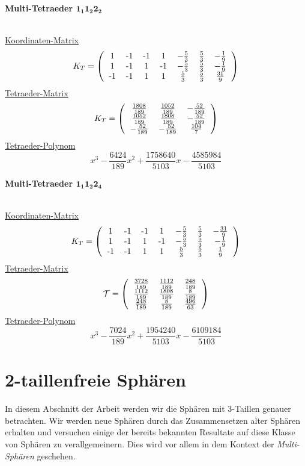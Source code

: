 \documentclass[12pt,titlepage,twoside,cleardoublepage]{article}
\theoremstyle{nummermitklammern}
\numberwithin{equation}{section}
\begin{document}
 \begin{large}
 \textbf{Multi-Tetraeder $\textbf{1}_\textbf{1}\textbf{1}_\textbf{2}\textbf{2}_\textbf{2}$}
 \end{large}\\
 \underline{Koordinaten-Matrix}
\[
K_T=\left(\begin{tabular}{ccccccc}
 1&-1&-1&1&$-\frac{5}{3}$&$\frac{5}{3}$&$-\frac{1}{9}$\\
 1&-1&1&-1&$-\frac{5}{3}$&$\frac{5}{3}$&$-\frac{1}{9}$\\
-1&-1&1&1&$\frac{5}{3}$&$\frac{5}{3}$&$\frac{31}{9}$\\
\end{tabular}\right)
\] 
\underline{Tetraeder-Matrix}
\[
K_T=\left(\begin{tabular}{ccc}
$\frac{1808}{189}$& $\frac{1052}{189}$& $-\frac{52}{189}$ \\
 $\frac{1052}{189}$& $\frac{1808}{189}$& $-\frac{52}{189}$ \\
 $-\frac{52}{189}$& $-\frac{52}{189}$& $\frac{104}{7}$ \\ 
\end{tabular}\right)
\]
\underline{Tetraeder-Polynom}
\[
  x^3-\frac{6424}{189}x^2+\frac{1758640}{5103}x-\frac{4585984}{5103}
\]
 \begin{large}
 \textbf{Multi-Tetraeder $\textbf{1}_\textbf{1}\textbf{1}_\textbf{2}\textbf{2}_\textbf{4}$}
 \end{large}\\
\underline{Koordinaten-Matrix} 
 \[
K_T=\left(\begin{tabular}{ccccccc}
 1&-1&-1&1&$-\frac{5}{3}$&$\frac{5}{3}$&$-\frac{31}{9}$\\
 1&-1&1&-1&$-\frac{5}{3}$&$\frac{5}{3}$&$-\frac{1}{9}$\\
-1&-1&1&1&$\frac{5}{3}$&$\frac{5}{3}$&$\frac{1}{9}$\\
\end{tabular}\right)
\] 
\underline{Tetraeder-Matrix}
\[
\mathcal{T}=\left(\begin{tabular}{ccc}
 $\frac{3728}{189}$&$\frac{1112}{189}$& $\frac{248}{189}$\\
 $\frac{1112}{189}$& $\frac{1808}{189}$& $\frac{8}{189}$ \\
 $\frac{248}{189}$& $\frac{8}{189}$&$\frac{ 496}{63}$ \\
\end{tabular}\right)
\]
\underline{Tetraeder-Polynom}
\[
  x^3-\frac{7024}{189}x^2+\frac{1954240}{5103}x-\frac{6109184}{5103} 
\] 
\newpage
 \section{2-taillenfreie Sphären}
In diesem Abschnitt der Arbeit werden wir die Sphären mit 3-Taillen genauer betrachten. Wir werden neue Sphären durch das Zusammensetzen alter Sphären erhalten und versuchen einige der bereits bekannten Resultate auf diese Klasse von Sphären zu verallgemeinern. Dies wird vor allem in dem Kontext der \emph{Multi-Sphären} geschehen.
\end{document}
